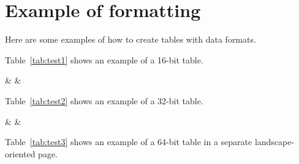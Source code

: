 \clearpage
\section*{Example of formatting}

Here are some examples of how to create tables with data formats.

Table~\ref{tab:test1} shows an example of a 16-bit table.
\begin{table}[htb]
  \caption{Example of a table for a 16-bit format}\label{tab:test1}
    \begin{bittabular}{16}
      & \bitNumTwoByte
      & \bitNumTwoByte
    \end{bittabular}
\end{table}

Table~\ref{tab:test2} shows an example of a 32-bit table.
\begin{table}[htb]
  \caption{Example of a table for a 32-bit format}\label{tab:test2}
    \begin{bittabular}{32}
      & \bitNumFourByte
      & \bitNumFourByte
    \end{bittabular}
\end{table}


Table~\ref{tab:test3} shows an example of a 64-bit table in a separate
landscape-oriented page.

